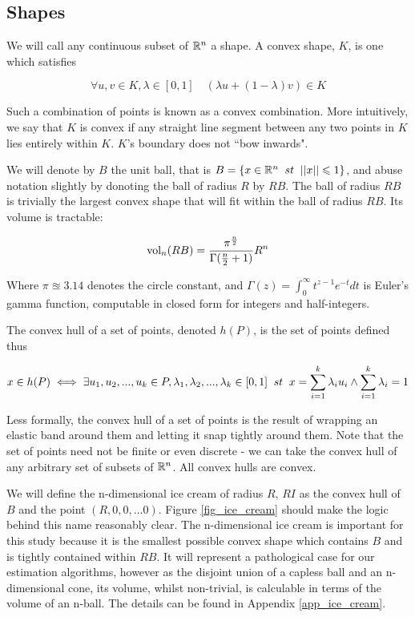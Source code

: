 \subsection{Shapes}

We will call any continuous subset of $\mathbb{R}^{n}$ a shape. A convex shape, $K$, is one which satisfies

$$
\forall u, v \in K, \lambda \in [0,1] \quad (\lambda u + (1-\lambda) v) \in K
$$

Such a combination of points is known as a convex combination. More intuitively, we say that $K$ is convex if any straight line segment between any two points in $K$ lies entirely within $K$. $K$'s boundary does not ``bow inwards".

We will denote by $B$ the unit ball, that is $B = \{x \in \mathbb{R}^n \;\; st \;\; ||x|| \leqslant 1\}$, and abuse notation slightly by donoting the ball of radius $R$ by $RB$. The ball of radius $RB$ is trivially the largest convex shape that will fit within the ball of radius $RB$. Its volume is tractable\cite{mathworld_ball}:

$$
\mbox{vol}_n(RB) = \frac{\pi^{\frac{n}{2}}}{\Gamma(\frac{n}{2}+1)}R^n
$$

Where $\pi \approxeq 3.14$ denotes the circle constant, and $\Gamma(z) = \int^\infty_0 t^{z-1}e^{-t} dt$ is Euler's gamma function, computable in closed form for integers and half-integers.

The convex hull of a set of points, denoted $h(P)$, is the set of points defined thus

$$
x \in h(P) \iff \exists u_1, u_2,...,u_k \in P, \lambda_1, \lambda_2, ..., \lambda_k  \in [0,1] \;\; st \;\; x = \sum^{k}_{i=1} \lambda_i u_i \wedge \sum^{k}_{i=1} \lambda_i = 1
$$

Less formally, the convex hull of a set of points is the result of wrapping an elastic band around them and letting it snap tightly around them. Note that the set of points need not be finite or even discrete - we can take the convex hull of any arbitrary set of subsets of $\mathbb{R}^n$. All convex hulls are convex.

We will define the n-dimensional ice cream of radius $R$, $RI$ as the convex hull of $B$ and the point $(R,0,0,...0)$. Figure \ref{fig_ice_cream} should make the logic behind this name reasonably clear. The n-dimensional ice cream is important for this study because it is the smallest possible convex shape which contains $B$ and is tightly contained within $RB$. It will represent a pathological case for our estimation algorithms, however as the disjoint union of a capless ball and an n-dimensional cone, its volume, whilst non-trivial, is calculable in terms of the volume of an n-ball. The details can be found in Appendix \ref{app_ice_cream}.

